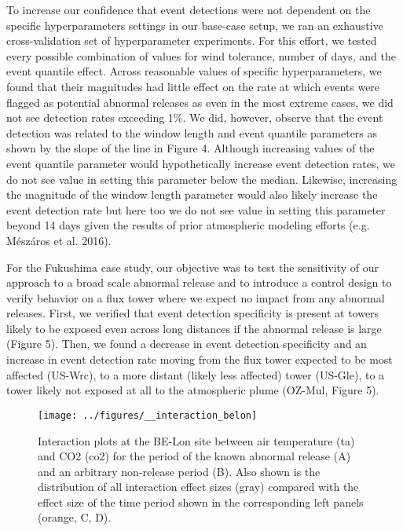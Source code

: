 \documentclass{article}
\begin{document}
To increase our confidence that event detections were not dependent on the specific hyperparameters settings in our base-case setup, we ran an exhaustive cross-validation set of hyperparameter experiments. For this effort, we tested every possible combination of values for wind tolerance, number of days, and the event quantile effect. Across reasonable values of specific hyperparameters, we found that their magnitudes had little effect on the rate at which events were flagged as potential abnormal releases as even in the most extreme cases, we did not see detection rates exceeding 1\%. We did, however, observe that the event detection was related to the window length and event quantile parameters as shown by the slope of the line in Figure 4. Although increasing values of the event quantile parameter would hypothetically increase event detection rates, we do not see value in setting this parameter below the median. Likewise, increasing the magnitude of the window length parameter would also likely increase the event detection rate but here too we do not see value in setting this parameter beyond 14 days given the results of prior atmospheric modeling efforts (e.g. Mészáros et al. 2016).

For the Fukushima case study, our objective was to test the sensitivity of our approach to a broad scale abnormal release and to introduce a control design to verify behavior on a flux tower where we expect no impact from any abnormal releases. First, we verified that event detection specificity is present at towers likely to be exposed even across long distances if the abnormal release is large (Figure 5). Then, we found a decrease in event detection specificity and an increase in event detection rate moving from the flux tower expected to be most affected (US-Wrc), to a more distant (likely less affected) tower (US-Gle), to a tower likely not exposed at all to the atmospheric plume (OZ-Mul, Figure 5).

\begin{figure}
	\centering
	\texttt{[image: ../figures/\_\_interaction\_belon]}
	\caption{Interaction plots at the BE-Lon site between air temperature (ta) and CO2 (co2) for the period of the known abnormal release (A) and an arbitrary non-release period (B). Also shown is the distribution of all interaction effect sizes (gray) compared with the effect size of the time period shown in the corresponding left panels (orange, C, D).}
	\label{fig:interaction}
\end{figure}
\end{document}
